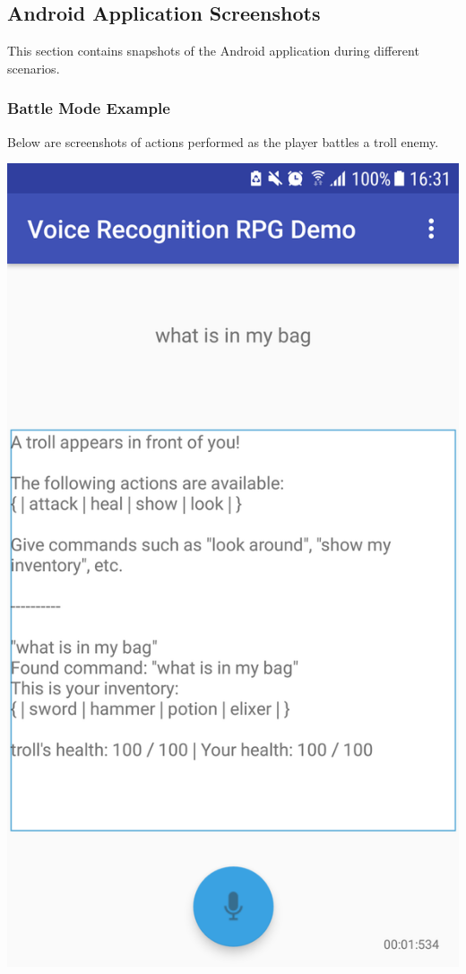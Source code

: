 \documentclass[11pt]{article}
\begin{document}
\subsection{Android Application Screenshots}
This section contains snapshots of the Android application during different scenarios.
\label{appendix:screenshots}
\subsubsection{Battle Mode Example}
\label{appendix:battle-mode-screenshots}
Below are screenshots of actions performed as the player battles a troll enemy.

\begin{center}
\includegraphics[scale=0.18]{battle-1.png}

\end{center}
\end{document}
